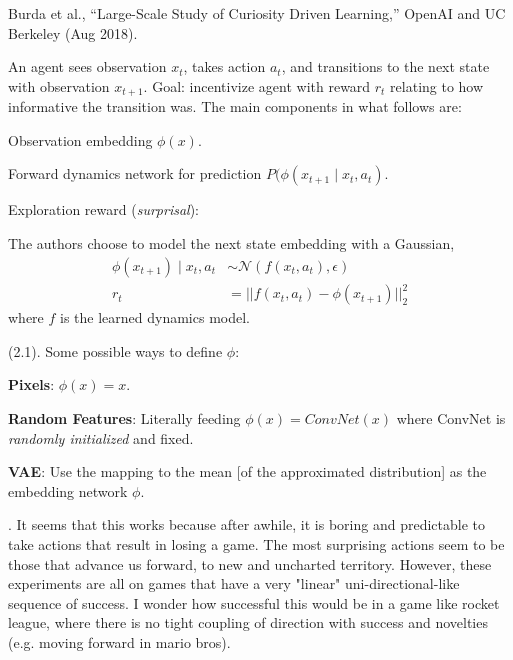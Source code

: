 \documentclass[11pt]{article}
\begin{document}
\vspace{-1em}
{\footnotesize Burda et al., ``Large-Scale Study of Curiosity Driven Learning,'' OpenAI and UC Berkeley (Aug 2018).}

An agent sees observation $x_t$, takes action $a_t$, and transitions to the next state with observation $x_{t + 1}$. Goal: incentivize agent with reward $r_t$ relating to how informative the transition was. The main components in what follows are:
\begin{compactitem}
	\item Observation embedding $\phi(x)$. 
	\item Forward dynamics network for prediction $P(\phi(x_{t+1} \mid x_t, a_t)$. 
	\item Exploration reward (\textit{surprisal}):
\end{compactitem}
The authors choose to model the next state embedding with a Gaussian,
\begin{align}
\phi(x_{t+1}) \mid x_t, a_t
&\sim \mathcal{N}(f(x_t, a_t), \epsilon ) \\
r_t 
&= ||f(x_t, a_t) - \phi(x_{t+1})||_2^2
\end{align}
where $f$ is the learned dynamics model. 

\myspace 
\p {} (2.1). Some possible ways to define $\phi$:
\begin{compactitem}
	\item \textbf{Pixels}: $\phi(x) = x$.
	
	\item \textbf{Random Features}: Literally feeding $\phi(x) = ConvNet(x)$ where ConvNet is \textit{randomly initialized} and fixed. 
	
	\item \textbf{VAE}: Use the mapping to the mean [of the approximated distribution] as the embedding network $\phi$. 
\end{compactitem}


\myspace
\p {}. It seems that this works because after awhile, it is boring and predictable to take actions that result in losing a game. The most surprising actions seem to be those that advance us forward, to new and uncharted territory. However, these experiments are all on games that have a very "linear" uni-directional-like sequence of success. I wonder how successful this would be in a game like rocket league, where there is no tight coupling of direction with success and novelties (e.g. moving forward in mario bros). 
\end{document}
